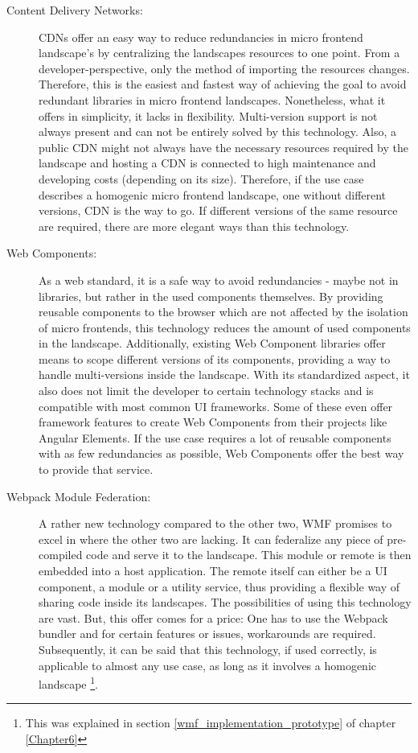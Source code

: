 \begin{description}
	\item[Content Delivery Networks:] CDNs offer an easy way to reduce redundancies in micro frontend landscape's by centralizing the landscapes resources to one point. 
	From a developer-perspective, only the method of importing the resources changes. 
	Therefore, this is the easiest and fastest way of achieving the goal to avoid redundant libraries in micro frontend landscapes. 
	Nonetheless, what it offers in simplicity, it lacks in flexibility. 
	Multi-version support is not always present and can not be entirely solved by this technology. 
	Also, a public CDN might not always have the necessary resources required by the landscape and hosting a CDN is connected to high maintenance and developing costs (depending on its size). 
	Therefore, if the use case describes a homogenic micro frontend landscape, one without different versions, CDN is the way to go. 
	If different versions of the same resource are required, there are more elegant ways than this technology.
	
	\item[Web Components:] As a web standard, it is a safe way to avoid redundancies - maybe not in libraries, but rather in the used components themselves. 
	By providing reusable components to the browser which are not affected by the isolation of micro frontends, this technology reduces the amount of used components in the landscape. 
	Additionally, existing Web Component libraries offer means to scope different versions of its components, providing a way to handle multi-versions inside the landscape. 
	With its standardized aspect, it also does not limit the developer to certain technology stacks and is compatible with most common UI frameworks. 
	Some of these even offer framework features to create Web Components from their projects like Angular Elements. 
	If the use case requires a lot of reusable components with as few redundancies as possible, Web Components offer the best way to provide that service.
	
	\item[Webpack Module Federation:] A rather new technology compared to the other two, WMF promises to excel in where the other two are lacking. 
	It can federalize any piece of pre-compiled code and serve it to the landscape. 
	This module or remote is then embedded into a host application. 
	The remote itself can either be a UI component, a module or a utility service, thus providing a flexible way of sharing code inside its landscapes. 
	The possibilities of using this technology are vast. 
	But, this offer comes for a price: One has to use the Webpack bundler and for certain features or issues, workarounds are required. 
	Subsequently, it can be said that this technology, if used correctly, is applicable to almost any use case, as long as it involves a homogenic landscape \footnote{This was explained in section \ref{wmf_implementation_prototype} of chapter \ref{Chapter6}}.
\end{description}

